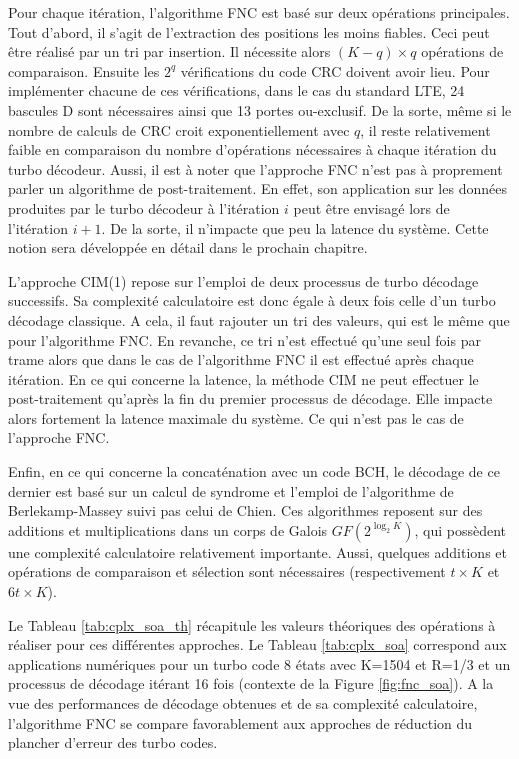 Pour chaque itération, l'algorithme FNC est basé sur deux opérations principales. Tout d'abord, il s'agit de l'extraction 
des positions les moins fiables. Ceci peut être réalisé par un tri par insertion. Il nécessite alors $(K-q)\times q$ 
opérations de comparaison. Ensuite les $2^q$ vérifications du code CRC doivent avoir lieu. Pour implémenter chacune de ces vérifications,
dans le cas du standard LTE, 24 bascules D sont nécessaires ainsi que 13 portes ou-exclusif. De la sorte, même si le 
nombre de calculs de CRC croit exponentiellement avec $q$, il reste relativement faible en comparaison du nombre 
d'opérations nécessaires à chaque itération du turbo décodeur. 
Aussi, il est à noter que l'approche FNC n'est pas à proprement parler un algorithme 
de post-traitement. En effet, son application sur les données produites par le turbo décodeur à l'itération $i$ peut être 
envisagé lors de l'itération $i+1$.  De la sorte, il n'impacte que peu la latence du système. Cette notion sera développée 
en détail dans le prochain chapitre.

L'approche CIM(1) repose sur l'emploi de deux processus de turbo décodage successifs. Sa complexité calculatoire est donc
égale à deux fois celle d'un turbo décodage classique. A cela, il faut rajouter un tri des valeurs, qui est 
le même que pour l'algorithme FNC. En revanche, ce tri n'est effectué qu'une seul fois par trame alors que dans le cas de l'algorithme
FNC il est effectué après chaque itération. En ce qui concerne la latence, la méthode CIM ne 
peut effectuer le post-traitement qu'après la fin du premier processus de décodage. Elle impacte alors fortement la latence
maximale du système. Ce qui n'est pas le cas de l'approche FNC.

Enfin, en ce qui concerne la concaténation avec un code BCH, le décodage de ce dernier est basé sur un calcul 
de syndrome et  l'emploi de l'algorithme
de Berlekamp-Massey suivi pas celui de Chien. Ces algorithmes reposent sur des additions et multiplications dans un corps
de Galois $GF(2^{\log_2 K})$, qui possèdent une complexité calculatoire relativement importante. Aussi, quelques additions
et opérations de comparaison et sélection sont nécessaires (respectivement $t\times K$ et $6t\times K$). 

Le Tableau \ref{tab:cplx_soa_th} récapitule les valeurs théoriques des opérations à réaliser pour ces différentes approches.
Le Tableau \ref{tab:cplx_soa} correspond aux applications numériques pour un turbo code 8 états avec K=1504 et 
R=1/3 et un processus de décodage itérant 16 fois (contexte de la Figure \ref{fig:fnc_soa}). A la vue des performances de 
décodage obtenues et de sa complexité calculatoire, l'algorithme FNC se compare favorablement aux approches de réduction
du plancher d'erreur des turbo codes.

